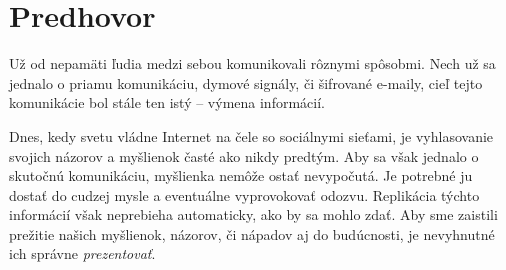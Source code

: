 \chapter*{Predhovor}

Už od nepamäti ľudia medzi sebou komunikovali rôznymi spôsobmi. Nech už sa jednalo o priamu komunikáciu, dymové signály, či šifrované e-maily, cieľ tejto komunikácie bol stále ten istý -- výmena informácií.

Dnes, kedy svetu vládne Internet na čele so sociálnymi sieťami, je vyhlasovanie svojich názorov a myšlienok časté ako nikdy predtým. Aby sa však jednalo o skutočnú komunikáciu, myšlienka nemôže ostať nevypočutá. Je potrebné ju dostať do cudzej mysle a eventuálne vyprovokovať odozvu. Replikácia týchto informácií však neprebieha automaticky, ako by sa mohlo zdať. Aby sme zaistili prežitie našich myšlienok, názorov, či nápadov aj do budúcnosti, je nevyhnutné ich správne \textit{prezentovať}.
